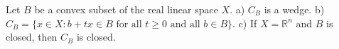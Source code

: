 Let $B$ be a convex subset of the real linear space $X$. a) $C_B$ is a wedge. b) $C_B = \{x \in X : b + tx \in B \text{ for all } t \geqslant 0 \text{ and all } b \in B\}$. c) If $X = \mathbb{R}^n$ and $B$ is closed, then $C_B$ is closed.